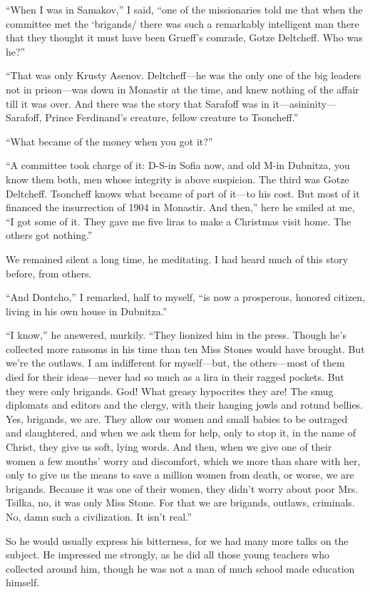 \documentclass[a5paper,12pt]{book}
\begin{document}
“When I was in Samakov,” I said, “one of the missionaries told me that when the committee met the ‘brigands/ there was such a remarkably intelligent man there that they thought it must have been Grueff’s comrade, Gotze Deltcheff. Who was he?”

“That was only Krusty Asenov. Deltcheff—he was the only one of the big leaders not in prison—was down in Monastir at the time, and knew nothing of the affair till it was over. And there was the story that Sarafoff was in it—asininity—Sarafoff, Prince Ferdinand’s creature, fellow creature to Tsoncheff.”

“What became of the money when you got it?”

“A committee took charge of it: D-S-in Sofia now, and old M-in Dubnitza, you know them both, men whose integrity is above suspicion. The third was Gotze Deltcheff. Tsoncheff knows what became of part of it—to his cost. But most of it financed the insurrection of 1904 in Monastir. And then,” here he smiled at me, “I got some of it. They gave me five liras to make a Christmas visit home. The others got nothing.”

We remained silent a long time, he meditating. I had heard much of this story before, from others.

“And Dontcho,” I remarked, half to myself, “is now a prosperous, honored citizen, living in his own house in Dubnitza.”

“I know,” he answered, murkily. “They lionized him in the press. Though he’s collected more ransoms in his time than ten Miss Stones would have brought. But we’re the outlaws. I am indifferent for myself—but, the others—most of them died for their ideas—never had so much as a lira in their ragged pockets. But they were only brigands. God! What greasy hypocrites they are! The smug diplomats and editors and the clergy, with their hanging jowls and rotund bellies. Yes, brigands, we are. They allow our women and small babies to be outraged and slaughtered, and when we ask them for help, only to stop it, in the name of Christ, they give us soft, lying words. And then, when we give one of their women a few months’ worry and discomfort, which we more than share with her, only to give us the means to save a million women from death, or worse, we are brigands. Because it was one of their women, they didn’t worry about poor Mrs. Tsilka, no, it was only Miss Stone. For that we are brigands, outlaws, criminals. No, damn such a civilization. It isn’t real.”

So he would usually express his bitterness, for we had many more talks on the subject. He impressed me strongly, as he did all those young teachers who collected around him, though he was not a man of much school made education himself.
\end{document}
